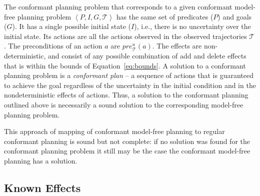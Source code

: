 \documentclass[letterpaper]{article}
\newcommand{\tuple}[1]{\ensuremath{\left \langle #1 \right \rangle }}
\begin{document}





The conformant planning problem that corresponds to a given conformant model-free planning problem $\tuple{P,I,G, \mathcal{T}}$ has the same set of predicates ($P$) and goals ($G$). It has a single possible initial state ($I$), i.e., there is no uncertainty over the initial state. Its actions are all the actions observed in the observed trajectories $\mathcal{T}$. The preconditions of an action $a$ are $pre_\mathcal{T}^u(a)$. The effects are non-deterministic, and consist of any possible combination of 
add and delete effects that is within the bounds of Equation~\ref{eq:bounds}. A solution to a conformant planning problem is a {\em conformant plan} -- a sequence of actions that is guaranteed to achieve the goal regardless of the uncertainty in the initial condition and in the nondeterministic effects of actions. Thus, a solution to the conformant planning outlined above is necessarily a sound solution to the corresponding model-free planning problem. 


This approach of mapping of conformant model-free planning to regular  conformant planning is sound but not complete: if no solution was found for the conformant planning problem it still may be the case the conformant model-free planning has a solution. 

\subsection{Known Effects}
\end{document}
